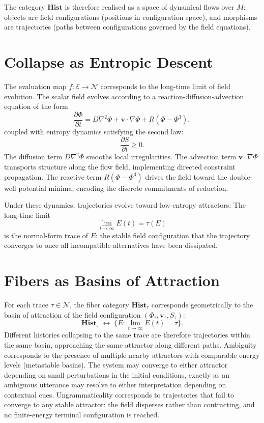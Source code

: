\documentclass[12pt, oneside]{amsbook}
\theoremstyle{plain}
\theoremstyle{definition}
\theoremstyle{remark}
\newcommand{\Expr}{\mathcal{E}}
\newcommand{\NF}{\mathcal{N}}
\newcommand{\evalf}{f}
\newcommand{\trace}{\tau}
\newcommand{\RSVPfield}{\Phi}
\newcommand{\RSVPvec}{\mathbf{v}}
\begin{document}
The category $\mathbf{Hist}$ is therefore realised as a space of dynamical
flows over $M$: objects are field configurations (positions in configuration
space), and morphisms are trajectories (paths between configurations governed
by the field equations).

\section{Collapse as Entropic Descent}

The evaluation map $\evalf : \Expr \to \NF$ corresponds to the long-time
limit of field evolution. The scalar field evolves according to a
reaction-diffusion-advection equation of the form
\[
  \frac{\partial \RSVPfield}{\partial t}
  = D \nabla^2 \RSVPfield
    + \RSVPvec \cdot \nabla \RSVPfield
    + R(\RSVPfield - \RSVPfield^3),
\]
coupled with entropy dynamics satisfying the second law:
\[
  \frac{\partial S}{\partial t} \geq 0.
\]
The diffusion term $D \nabla^2 \RSVPfield$ smooths local irregularities.
The advection term $\RSVPvec \cdot \nabla \RSVPfield$ transports structure
along the flow field, implementing directed constraint propagation. The
reactive term $R(\RSVPfield - \RSVPfield^3)$ drives the field toward the
double-well potential minima, encoding the discrete commitments of reduction.

Under these dynamics, trajectories evolve toward low-entropy attractors. The
long-time limit
\[
  \lim_{t \to \infty} E(t) = \trace(E)
\]
is the normal-form trace of $E$: the stable field configuration that the
trajectory converges to once all incompatible alternatives have been
dissipated.

\section{Fibers as Basins of Attraction}

For each trace $\tau \in \NF$, the fiber category $\mathbf{Hist}_\tau$
corresponds geometrically to the basin of attraction of the field
configuration $(\RSVPfield_\tau, \RSVPvec_\tau, S_\tau)$:
\[
  \mathbf{Hist}_\tau \;\longleftrightarrow\;
  \bigl\{ E : \lim_{t \to \infty} E(t) = \tau \bigr\}.
\]
Different histories collapsing to the same trace are therefore trajectories
within the same basin, approaching the same attractor along different paths.
Ambiguity corresponds to the presence of multiple nearby attractors with
comparable energy levels (metastable basins). The system may converge to
either attractor depending on small perturbations in the initial conditions,
exactly as an ambiguous utterance may resolve to either interpretation
depending on contextual cues. Ungrammaticality corresponds to trajectories
that fail to converge to any stable attractor: the field disperses rather
than contracting, and no finite-energy terminal configuration is reached.
\end{document}
